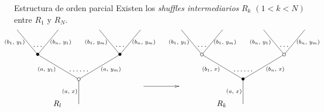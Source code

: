 \documentclass[12pt,aspectratio=169]{beamer}
\numberwithin{equation}{section}
\theoremstyle{definition}
\begin{document}
{\begin{frame}{Estructura de orden parcial}
    Existen los \emph{shuffles intermediarios} $R_k$ $(1 < k < N)$ entre $R_1$ y $R_N$. %
    $$
        \xy
        <0.075cm, 0cm>:
        (0.0, 0.0)*{}="1"; %
        (0.0, 15.0)*\cir<2pt>{}="2"; %
        (-25.0, 30.0)*=0{\bullet}="3"; %
        (-37.5, 45.0)*{}="4"; %
        (-12.5, 45.0)*{}="5"; %
        (25.0, 30.0)*=0{\bullet}="6"; %
        (12.5, 45.0)*{}="7"; %
        (37.5, 45.0)*{}="8"; %
        "1";"2" **\dir{-};
        "2";"3" **\dir{-};
        "3";"4" **\dir{-};
        "3";"5" **\dir{-};
        "2";"6" **\dir{-};
        "6";"7" **\dir{-};
        "6";"8" **\dir{-};
        (-5.5, 7.5)*=0{\scriptstyle (a,\text{ }x)};
        (-19.5, 21)*=0{\scriptstyle (a,\text{ }y_1)};
        (-39, 37.5)*=0{\scriptstyle (b_1,\text{ }y_1)};
        (-11, 37.5)*=0{\scriptstyle (b_n,\text{ }y_1)};
        (19.5, 21)*=0{\scriptstyle (a,\text{ }y_m)};
        (10.5, 37.5)*=0{\scriptstyle (b_1,\text{ }y_m)};
        (39.5, 37.5)*=0{\scriptstyle (b_n,\text{ }y_m)};
        (-25,35)*{\dots};
        (25,35)*{\dots};
        (0,20)*{\dots\dots};
        (-13,0)*{R_l};
        \endxy
        \xy
        <0.08cm, 0cm>:
        (-10, 0.0)*{}="1";
        (10, 10.0)*{}="2";
        {\ar(-10, 10)*{};(10,10)*{}};
        \endxy
        \xy
        <0.075cm, 0cm>:
        (0.0, 0.0)*{}="1"; %
        (0.0, 15.0)*=0{\bullet}="2"; %
        (-25.0, 30.0)*\cir<2pt>{}="3"; %
        (-37.5, 45.0)*{}="4"; %
        (-12.5, 45.0)*{}="5"; %
        (25.0, 30.0)*\cir<2pt>{}="6"; %
        (12.5, 45.0)*{}="7"; %
        (37.5, 45.0)*{}="8"; %
        "1";"2" **\dir{-};
        "2";"3" **\dir{-};
        "3";"4" **\dir{-};
        "3";"5" **\dir{-};
        "2";"6" **\dir{-};
        "6";"7" **\dir{-};
        "6";"8" **\dir{-};
        (-5.5, 7.5)*=0{\scriptstyle (a,\text{ }x)};
        (-19.5, 21)*=0{\scriptstyle (b_1,\text{ }x)};
        (-39, 37.5)*=0{\scriptstyle (b_1,\text{ }y_1)};
        (-11, 37.5)*=0{\scriptstyle (b_1,\text{ }y_m)};
        (19.5, 21)*=0{\scriptstyle (b_n,\text{ }x)};
        (10.5, 37.5)*=0{\scriptstyle (b_n,\text{ }y_1)};
        (39.5, 37.5)*=0{\scriptstyle (b_n,\text{ }y_m)};
        (-25,35)*{\dots};
        (25,35)*{\dots};
        (0,20)*{\dots\dots};
        (-13,0)*{R_k};
        \endxy
    $$


\end{frame}}
\end{document}
